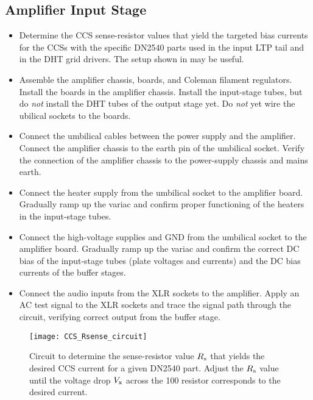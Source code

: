 \subsection{Amplifier Input Stage}
\begin{itemize}
\item Determine the CCS sense-resistor values that yield the targeted bias currents for the CCSs with the specific DN2540 parts used in the input LTP tail and in the DHT grid drivers. The setup shown in  may be useful.
\item Assemble the amplifier chassis, boards, and Coleman filament regulators. Install the boards in the amplifier chassis. Install the input-stage tubes, but do \emph{not} install the DHT tubes of the output stage yet. Do \emph{not} yet wire the ubilical sockets to the boards.
\item Connect the umbilical cables between the power supply and the amplifier. Connect the amplifier chassis to the earth pin of the umbilical socket. Verify the connection of the amplifier chassis to the power-supply chassis and mains earth.
\item Connect the heater supply from the umbilical socket to the amplifier board. Gradually ramp up the variac and confirm proper functioning of the heaters in the input-stage tubes.
\item Connect the high-voltage supplies and GND from the umbilical socket to the amplifier board. Gradually ramp up the variac and confirm the correct DC bias of the input-stage tubes (plate voltages and currents) and the DC bias currents of the buffer stages.
\item Connect the audio inputs from the XLR sockets to the amplifier. Apply an AC test signal to the XLR sockets and trace the signal path through the circuit, verifying correct output from the buffer stage.
\end{itemize}

\begin{figure}
\begin{center}
\texttt{[image: CCS\_Rsense\_circuit]}
\caption{Circuit to determine the sense-resistor value $R_{\textrm s}$ that yields the desired CCS current for a given DN2540 part. Adjust the $R_{\textrm s}$ value until the voltage drop $V_{\textrm x}$ across the \SI{100}{\Ohm} resistor corresponds to the desired current.}
\end{center}
\end{figure}


